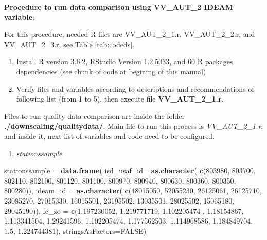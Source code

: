 \documentclass[12pt,oneside]{reedthesis}
\newenvironment{Shaded}{\begin{snugshade}}{\end{snugshade}}
\newcommand{\DataTypeTok}[1]{\textcolor[rgb]{0.13,0.29,0.53}{#1}}
\newcommand{\DecValTok}[1]{\textcolor[rgb]{0.00,0.00,0.81}{#1}}
\newcommand{\FloatTok}[1]{\textcolor[rgb]{0.00,0.00,0.81}{#1}}
\newcommand{\KeywordTok}[1]{\textcolor[rgb]{0.13,0.29,0.53}{\textbf{#1}}}
\newcommand{\NormalTok}[1]{#1}
\newcommand{\OtherTok}[1]{\textcolor[rgb]{0.56,0.35,0.01}{#1}}
\newcommand{\StringTok}[1]{\textcolor[rgb]{0.31,0.60,0.02}{#1}}
\providecommand{\tightlist}{%
  \setlength{\itemsep}{0pt}\setlength{\parskip}{0pt}}
\begin{document}
\textbf{Procedure to run data comparison using VV\_AUT\_2 IDEAM variable}:

For this procedure, needed R files are VV\_AUT\_2\_1.r, VV\_AUT\_2\_2.r, and VV\_AUT\_2\_3.r, see Table \ref{tab:codeds}.
\begin{enumerate}
\def\labelenumi{\arabic{enumi}.}
\item
  Install R version 3.6.2, RStudio Version 1.2.5033, and 60 R packages dependencies (see chunk of code at begining of this manual)
\item
  Verify files and variables according to descriptions and recommendations of following list (from 1 to 5), then execute file \textbf{VV\_AUT\_2\_1.r}.
\end{enumerate}
Files to run quality data comparison are inside the folder \textbf{./downscaling/qualitydata/}. Main file to run this process is \emph{VV\_AUT\_2\_1.r}, and inside it, next list of variables and code need to be configured.
\begin{enumerate}
\def\labelenumi{\arabic{enumi}.}
\tightlist
\item
  \emph{stationssample}
\end{enumerate}
\scriptsize

\vspace{0.4cm}
\begin{Shaded}
\begin{Highlighting}[]
\NormalTok{    stationssample =}\StringTok{ }\KeywordTok{data.frame}\NormalTok{(}
      \DataTypeTok{isd_usaf_id=} \KeywordTok{as.character}\NormalTok{(}
        \KeywordTok{c}\NormalTok{(}\DecValTok{803980}\NormalTok{, }\DecValTok{803700}\NormalTok{, }\DecValTok{802110}\NormalTok{, }\DecValTok{802100}\NormalTok{, }\DecValTok{801120}\NormalTok{, }\DecValTok{801100}\NormalTok{, }
          \DecValTok{800970}\NormalTok{, }\DecValTok{800940}\NormalTok{, }\DecValTok{800630}\NormalTok{, }\DecValTok{800360}\NormalTok{, }\DecValTok{800350}\NormalTok{, }\DecValTok{800280}\NormalTok{)), }
      \DataTypeTok{ideam_id =} \KeywordTok{as.character}\NormalTok{(}
        \KeywordTok{c}\NormalTok{(}\DecValTok{48015050}\NormalTok{, }\DecValTok{52055230}\NormalTok{, }\DecValTok{26125061}\NormalTok{, }\DecValTok{26125710}\NormalTok{, }\DecValTok{23085270}\NormalTok{, }\DecValTok{27015330}\NormalTok{, }
          \DecValTok{16015501}\NormalTok{, }\DecValTok{23195502}\NormalTok{, }\DecValTok{13035501}\NormalTok{, }\DecValTok{28025502}\NormalTok{, }\DecValTok{15065180}\NormalTok{, }\DecValTok{29045190}\NormalTok{)),}
      \DataTypeTok{fc_zo =} 
        \KeywordTok{c}\NormalTok{(}\FloatTok{1.197230052}\NormalTok{, }\FloatTok{1.219771719}\NormalTok{, }\FloatTok{1.102205474}\NormalTok{ , }\FloatTok{1.18154867}\NormalTok{, }\FloatTok{1.113341504}\NormalTok{, }\FloatTok{1.29241596}\NormalTok{, }
          \FloatTok{1.102205474}\NormalTok{, }\FloatTok{1.177562503}\NormalTok{, }\FloatTok{1.114968586}\NormalTok{, }\FloatTok{1.184849704}\NormalTok{, }\FloatTok{1.5}\NormalTok{, }\FloatTok{1.224744381}\NormalTok{),  }
      \DataTypeTok{stringsAsFactors=}\OtherTok{FALSE}\NormalTok{)}
\end{Highlighting}
\end{Shaded}
\normalsize
\end{document}
